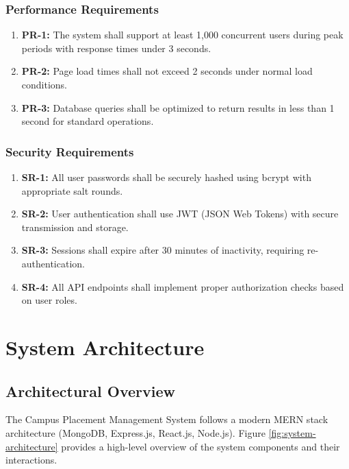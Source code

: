 \documentclass[12pt,a4paper]{report}
\begin{document}
\subsection{Performance Requirements}
\begin{enumerate}
    \item \textbf{PR-1:} The system shall support at least 1,000 concurrent users during peak periods with response times under 3 seconds.
    
    \item \textbf{PR-2:} Page load times shall not exceed 2 seconds under normal load conditions.
    
    \item \textbf{PR-3:} Database queries shall be optimized to return results in less than 1 second for standard operations.
\end{enumerate}

\subsection{Security Requirements}
\begin{enumerate}
    \item \textbf{SR-1:} All user passwords shall be securely hashed using bcrypt with appropriate salt rounds.
    
    \item \textbf{SR-2:} User authentication shall use JWT (JSON Web Tokens) with secure transmission and storage.
    
    \item \textbf{SR-3:} Sessions shall expire after 30 minutes of inactivity, requiring re-authentication.
    
    \item \textbf{SR-4:} All API endpoints shall implement proper authorization checks based on user roles.
\end{enumerate}

\chapter{System Architecture}

\section{Architectural Overview}
The Campus Placement Management System follows a modern MERN stack architecture (MongoDB, Express.js, React.js, Node.js). Figure \ref{fig:system-architecture} provides a high-level overview of the system components and their interactions.
\end{document}
